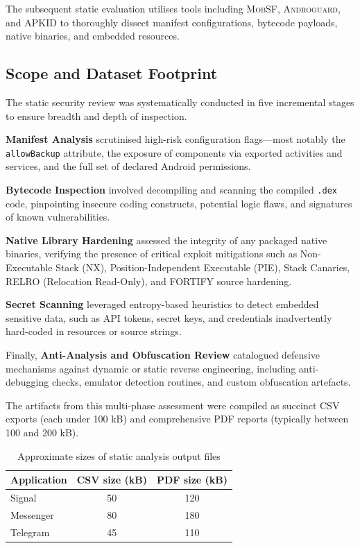 \documentclass[a4paper,12pt]{report}
\begin{document}
The subsequent static evaluation utilises tools including \textsc{MobSF}, \textsc{Androguard}, and \textsc{APKID} to thoroughly dissect manifest configurations, bytecode payloads, native binaries, and embedded resources.

\subsection{Scope and Dataset Footprint}

The static security review was systematically conducted in five incremental stages to ensure breadth and depth of inspection.

\textbf{Manifest Analysis} scrutinised high-risk configuration flags—most notably the \lstinline{allowBackup} attribute, the exposure of components via exported activities and services, and the full set of declared Android permissions.

\textbf{Bytecode Inspection} involved decompiling and scanning the compiled \texttt{.dex} code, pinpointing insecure coding constructs, potential logic flaws, and signatures of known vulnerabilities.

\textbf{Native Library Hardening} assessed the integrity of any packaged native binaries, verifying the presence of critical exploit mitigations such as Non-Executable Stack (NX), Position-Independent Executable (PIE), Stack Canaries, RELRO (Relocation Read-Only), and \textsc{FORTIFY} source hardening.

\textbf{Secret Scanning} leveraged entropy-based heuristics to detect embedded sensitive data, such as API tokens, secret keys, and credentials inadvertently hard-coded in resources or source strings.

Finally, \textbf{Anti-Analysis and Obfuscation Review} catalogued defensive mechanisms against dynamic or static reverse engineering, including anti-debugging checks, emulator detection routines, and custom obfuscation artefacts.


The artifacts from this multi-phase assessment were compiled as succinct CSV exports (each under 100 kB) and comprehensive PDF reports (typically between 100 and 200 kB).

\begin{table}[H]
\centering
\begin{tabular}{|l|c|c|}
\hline
\textbf{Application} & \textbf{CSV size (kB)} & \textbf{PDF size (kB)} \\
\hline
Signal & 50 & 120 \\
Messenger & 80 & 180 \\
Telegram & 45 & 110 \\
\hline
\end{tabular}
\caption{Approximate sizes of static analysis output files}
\label{tab:static-sizes}
\end{table}
\end{document}
